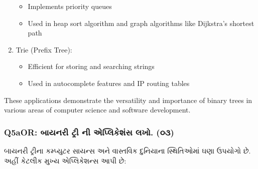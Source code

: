 \begin{enumerate}
  \begin{itemize}
  \tightlist
  \item
    Implements priority queues
  \item
    Used in heap sort algorithm and graph algorithms like Dijkstra's
    shortest path
  \end{itemize}
\item
  Trie (Prefix Tree):

  \begin{itemize}
  \tightlist
  \item
    Efficient for storing and searching strings
  \item
    Used in autocomplete features and IP routing tables
  \end{itemize}
\end{enumerate}

These applications demonstrate the versatility and importance of binary
trees in various areas of computer science and software development.

\hypertarget{q5aor-uxaacuxaafuxaa8uxab0-uxa9fuxab0-uxaa8-uxa8fuxaaauxab2uxa95uxab6uxab8-uxab2uxa96.-uxae6uxae9}{%
\subsubsection{Q5aOR: બાયનરી ટ્રી ની એપ્લિકેશંસ લખો.
(૦૩)}\label{q5aor-uxaacuxaafuxaa8uxab0-uxa9fuxab0-uxaa8-uxa8fuxaaauxab2uxa95uxab6uxab8-uxab2uxa96.-uxae6uxae9}}

બાયનરી ટ્રીના કમ્પ્યુટર સાયન્સ અને વાસ્તવિક દુનિયાના સ્થિતિઓમાં ઘણા ઉપયોગો છે. અહીં
કેટલીક મુખ્ય એપ્લિકેશન્સ આપી છે:

